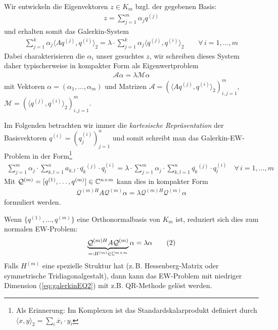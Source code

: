 Wir entwickeln die Eigenvektoren $z\in K_m$ bzgl. der gegebenen Basis:
%
\begin{align*}
  z = \sum_{j=1}^{m} \alpha_j q^{(j)}
\end{align*}
%
und erhalten somit das Galerkin-System
%
\begin{align*}
  \sum_{j=1}^{k} \alpha_j \langle Aq^{(j)},q^{(i)}\rangle_2 
  = \lambda\cdot\sum_{j=1}^{k} \alpha_j \langle q^{(j)},q^{(i)}\rangle_2
  \qquad\forall\,i=1,\dots,m
\end{align*}
Dabei charakterisieren die $\alpha_i$ unser gesuchtes $z$, wir schreiben dieses System daher typischerweise 
in kompakter Form als Eigenwertproblem
%
\begin{align*}
  \mathcal{A}\alpha = \lambda\mathcal{M}\alpha
\end{align*} 
%
mit Vektoren $\alpha=(\alpha_1,\dots,\alpha_m)$ und Matrizen
$\mathcal{A}=(\langle Aq^{(j)}, q^{(i)}\rangle_2)_{i,j=1}^m$, 
$\mathcal{M} = (\langle q^{(j)}, q^{(i)}\rangle_2)_{i,j=1}^m$.

Im Folgenden betrachten wir immer die \textit{kartesische Repräsentation} der Basisvektoren $q^{(i)}=(q_j^{(i)})_{j=1}^n$ 
und somit schreibt man das Galerkin-EW-Problem in der Form\footnote{
  Als Erinnerung: Im Komplexen ist das Standardskalarprodukt definiert durch 
  $\langle x,y\rangle_2 = \sum_i \overline{x}_i\cdot y_i$
}
%
\begin{align*}
  \sum_{j=1}^{m} \alpha_j\cdot \sum_{k,l=1}^{n} a_{k,l}\cdot \overline{q_k}^{(j)}\cdot q^{(i)}_l 
  = \lambda\cdot \sum_{j=1}^{m} \alpha_j \cdot\sum_{k,l=1}^{n}\overline{q_k}^{(j)}\cdot q^{(i)}_l
  \quad\forall\, i=1,\dots,m
\end{align*}
%
Mit $\mathcal{Q}^{(m)}=[q^{(1)},\dots,q^{(m)}]\in\mathbb C^{n\times m}$ kann dies in kompakter Form
%
\begin{align*}
  \mathcal{Q}^{(m)H}A\mathcal{Q}^{(m)}\alpha = \lambda \mathcal{Q}^{(m)H}\mathcal{Q}^{(m)}\alpha
\end{align*}
formuliert werden.

Wenn $\{q^{(1)},\dots,q^{(m)}\}$ eine Orthonormalbasis von $K_m$ ist, reduziert sich dies zum normalen EW-Problem:
%
\begin{align*}
  \underbrace{\mathcal{Q}^{(m)H}A\mathcal{Q}^{(m)}}_{=: H^{(m)}\in\mathbb C^{m\times m}}\alpha 
  = \lambda \alpha 
  \tag{2}\label{eq:galerkinEQ2}
\end{align*}
%
Falls $H^{(m)}$ eine spezielle Struktur hat (z.\,B. Hessenberg-Matrix oder symmetrische Tridiagonalgestalt), dann kann 
das EW-Problem mit niedriger Dimension (\ref{eq:galerkinEQ2}) mit z.B. QR-Methode gelöst werden. 

